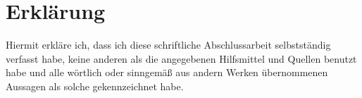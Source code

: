 \section*{Erklärung}
Hiermit erkläre ich, dass ich diese schriftliche Abschlussarbeit selbstständig verfasst habe, keine anderen als die angegebenen Hilfsmittel und Quellen benutzt habe und alle wörtlich oder sinngemäß aus andern Werken übernommenen Aussagen als solche gekennzeichnet habe.